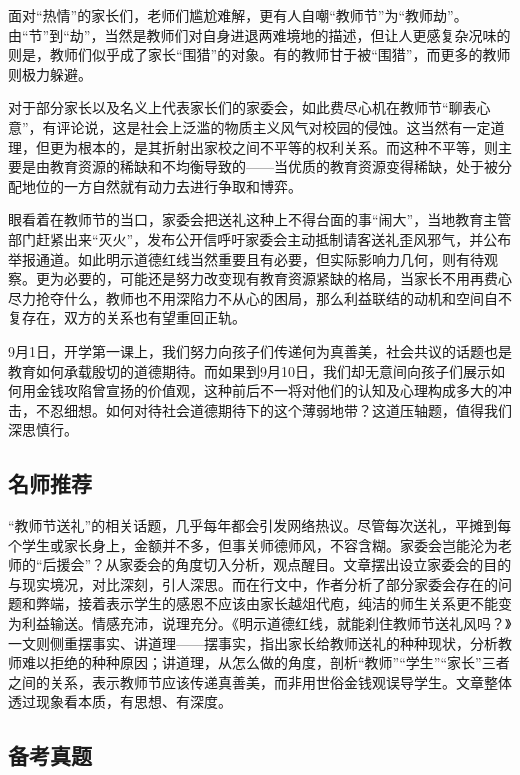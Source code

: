 面对“热情”的家长们，老师们尴尬难解，更有人自嘲“教师节”为“教师劫”。由“节”到“劫”，当然是教师们对自身进退两难境地的描述，但让人更感复杂况味的则是，教师们似乎成了家长“围猎”的对象。有的教师甘于被“围猎”，而更多的教师则极力躲避。

对于部分家长以及名义上代表家长们的家委会，如此费尽心机在教师节“聊表心意”，有评论说，这是社会上泛滥的物质主义风气对校园的侵蚀。这当然有一定道理，但更为根本的，是其折射出家校之间不平等的权利关系。而这种不平等，则主要是由教育资源的稀缺和不均衡导致的——当优质的教育资源变得稀缺，处于被分配地位的一方自然就有动力去进行争取和博弈。

眼看着在教师节的当口，家委会把送礼这种上不得台面的事“闹大”，当地教育主管部门赶紧出来“灭火”，发布公开信呼吁家委会主动抵制请客送礼歪风邪气，并公布举报通道。如此明示道德红线当然重要且有必要，但实际影响力几何，则有待观察。更为必要的，可能还是努力改变现有教育资源紧缺的格局，当家长不用再费心尽力抢夺什么，教师也不用深陷力不从心的困局，那么利益联结的动机和空间自不复存在，双方的关系也有望重回正轨。

9月1日，开学第一课上，我们努力向孩子们传递何为真善美，社会共议的话题也是教育如何承载殷切的道德期待。而如果到9月10日，我们却无意间向孩子们展示如何用金钱攻陷曾宣扬的价值观，这种前后不一将对他们的认知及心理构成多大的冲击，不忍细想。如何对待社会道德期待下的这个薄弱地带？这道压轴题，值得我们深思慎行。


\subsection*{名师推荐}

“教师节送礼”的相关话题，几乎每年都会引发网络热议。尽管每次送礼，平摊到每个学生或家长身上，金额并不多，但事关师德师风，不容含糊。家委会岂能沦为老师的“后援会”？从家委会的角度切入分析，观点醒目。文章摆出设立家委会的目的与现实境况，对比深刻，引人深思。而在行文中，作者分析了部分家委会存在的问题和弊端，接着表示学生的感恩不应该由家长越俎代庖，纯洁的师生关系更不能变为利益输送。情感充沛，说理充分。《明示道德红线，就能刹住教师节送礼风吗？》一文则侧重摆事实、讲道理——摆事实，指出家长给教师送礼的种种现状，分析教师难以拒绝的种种原因；讲道理，从怎么做的角度，剖析“教师”“学生”“家长”三者之间的关系，表示教师节应该传递真善美，而非用世俗金钱观误导学生。文章整体透过现象看本质，有思想、有深度。

\subsection*{备考真题}


